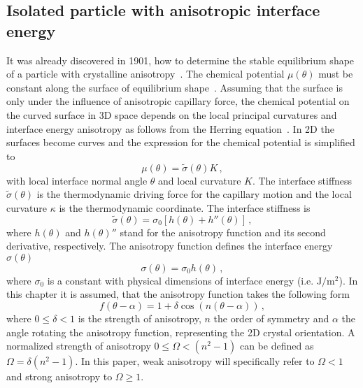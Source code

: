 	\subsection{Isolated particle with anisotropic interface energy} \label{sec_isol_aniso_particle}
	It was already discovered in 1901, how to determine the stable equilibrium shape of a particle with crystalline anisotropy~\cite{Wulff1901}. The chemical potential $\mu(\theta)$ must be constant along the surface of equilibrium shape~\cite{Bao2017}. Assuming that the surface is only under the influence of anisotropic capillary force, the chemical potential on the curved surface in 3D space depends on the local principal curvatures and interface energy anisotropy as follows from the Herring equation~\cite{Herring1951, Johnson1965}. In 2D the surfaces become curves and the expression for the chemical potential is simplified to
	\begin{equation}\label{eq_chempot_constant}
		\mu(\theta) = \tilde{\sigma}(\theta)K \,,
	\end{equation}
	with local interface normal angle $\theta$ and local curvature $K$. The interface stiffness $\tilde{\sigma}(\theta)$ is the thermodynamic driving force for the capillary motion and the local curvature $\kappa$ is the thermodynamic coordinate. The interface stiffness is 
	\begin{equation} \label{eq_def_interface_siffness}
		\tilde{\sigma}(\theta)=\sigma_0[h(\theta)+h''(\theta)] \,,
	\end{equation}
	where $h(\theta)$ and $h(\theta)''$ stand for the anisotropy function and its second derivative, respectively. The anisotropy function defines the interface energy $\sigma(\theta)$
	\begin{equation} \label{eq_anisoIE}
		\sigma(\theta) = \sigma_0  h(\theta) \,,
	\end{equation}
	where $\sigma_0$ is a constant with physical dimensions of interface energy (i.e. $\mathrm{J/m^2}$). In this chapter it is assumed, that the anisotropy function takes the following form 
	\begin{equation} \label{eq_anisofun}
		f(\theta -\alpha) = 1+\delta\cos(n(\theta-\alpha)) \,,
	\end{equation}
	where $0\leq\delta<1$ is the strength of anisotropy, $n$ the order of symmetry and $\alpha$ the angle rotating the anisotropy function, representing the 2D crystal orientation. A normalized strength of anisotropy $0\leq \Omega < (n^2-1)$ can be defined as $\Omega=\delta(n^2-1)$. In this paper, weak anisotropy will specifically refer to $\Omega<1$ and strong anisotropy to $\Omega\geq1$.
	

